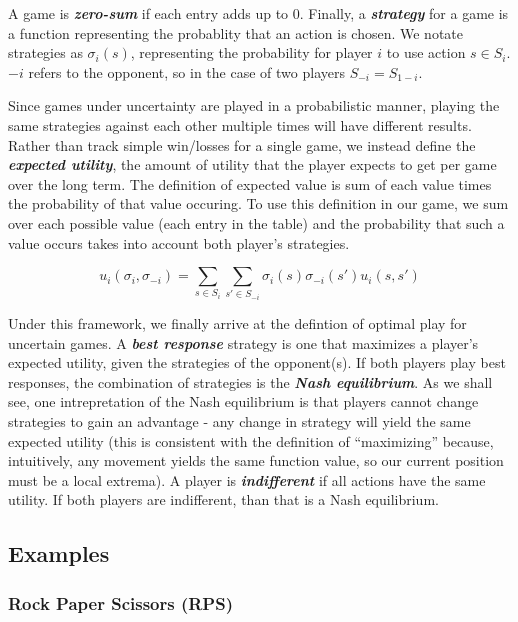 \documentclass[11pt, oneside]{article}
\newcommand{\emphasis}[1]{\textbf{\textit{#1}}}
\begin{document}
A game is \emphasis{zero-sum} if each entry adds up to 0.
Finally, a \emphasis{strategy} for a game is a function representing the probablity
that an action is chosen. We notate strategies as \( \sigma_i (s) \), representing
the probability for player \( i \) to use action \( s \in S_i \). \( -i \) refers
to the opponent, so in the case of two players \( S_{-i} = S_{1 - i} \).

Since games under uncertainty are played in a probabilistic manner,
playing the same strategies against each other multiple times will have different results.
Rather than track simple win/losses for a single game, we instead define the
\emphasis{expected utility}, the amount of utility that the player expects to get
per game over the long term.
 The definition of expected value is sum of each value times the probability of that value occuring.
 To use this definition in our game, we sum over each possible value (each entry in the table)
 and the probability that such a value occurs takes into account both player's strategies.

 \[ u_i (\sigma_i, \sigma_{-i}) = \sum_{s \in S_i} \sum_{s' \in S_{-i}} \sigma_i(s) \sigma_{-i} (s') u_i(s, s') \]

Under this framework, we finally arrive at the defintion of optimal play for uncertain games.
A \emphasis{best response} strategy is one that maximizes a player's expected
utility, given the strategies of the opponent(s). If both players play
best responses, the combination of strategies is the \emphasis{Nash equilibrium}.
As we shall see, one intrepretation of the Nash equilibrium is that players cannot
change strategies to gain an advantage - any change in strategy will
yield the same expected utility (this is consistent with the definition of ``maximizing'' because,
intuitively, any movement yields the same function value, so our current position must be a local extrema).
A player is \emphasis{indifferent} if all actions have the same utility.
If both players are indifferent, than that is a Nash equilibrium.

\subsection{Examples}
\subsubsection{Rock Paper Scissors (RPS)}
\end{document}
